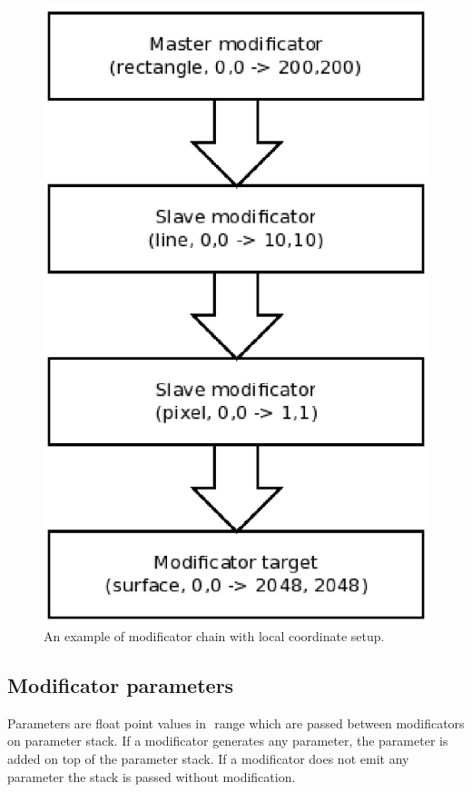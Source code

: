 \documentclass[9pt]{article}
\begin{document}
\begin{figure}[h]
\begin{center}
  \includegraphics[scale=0.6]{p05.eps}
  \caption{An example of modificator chain with local coordinate setup.}
  \label{coord_modificator_chain}
\end{center}
\end{figure}

\newpage
\subsection{Modificator parameters}

Parameters are float point values in \begin{math}<0,1>\end{math} range which are passed between
modificators on parameter stack. If a modificator generates any parameter, the
parameter is added on top of the parameter stack. If a modificator does not
emit any parameter the stack is passed without modification.
\end{document}

